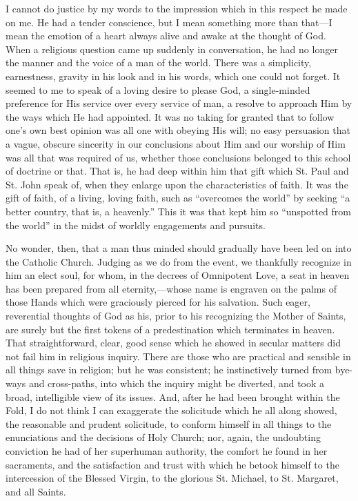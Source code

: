 I cannot do justice by my words to the impression
which in this respect he made on me. He had a tender
conscience, but I mean something more than that—I
mean the emotion of a heart always alive and awake at the
thought of God. When a religious question came up
suddenly in conversation, he had no longer the manner and
the voice of a man of the world. There was a simplicity,
earnestness, gravity in his look and in his words, which
one could not forget. It seemed to me to speak of a
loving desire to please God, a single-minded preference
for His service over every service of man, a resolve to
approach Him by the ways which He had appointed. It was
no taking for granted that to follow one's own best
opinion was all one with obeying His will; no easy
persuasion that a vague, obscure sincerity in our
conclusions about Him and our worship of Him was all that
was required of us, whether those conclusions belonged to
this school of doctrine or that. That is, he had deep
within him that gift which St. Paul and St. John speak
of, when they enlarge upon the characteristics of faith.
It was the gift of faith, of a living, loving faith, such
as ``overcomes the world'' by seeking ``a
better country, that is, a heavenly.'' This it was
that kept him so ``unspotted from the world'' in
the midst of worldly engagements and pursuits.

No wonder, then, that a man thus minded should
gradually have been led on into the Catholic Church.
Judging as we do from the event, we thankfully recognize
in him an elect soul, for whom, in the decrees of
Omnipotent Love, a seat in heaven has been prepared from
all eternity,—whose name is engraven on the palms of
those Hands which were graciously pierced for his
salvation. Such eager, reverential thoughts of God as
his, prior to his recognizing the Mother of Saints, are
surely but the first tokens of a predestination which
terminates in heaven. That straightforward, clear, good
sense which he showed in secular matters did not fail him
in religious inquiry. There are those who are practical
and sensible in all things save in religion; but he was
consistent; he instinctively turned from bye-ways and
cross-paths, into which the inquiry might be diverted,
and took a broad, intelligible view of its issues. And,
after he had been brought within the Fold, I do not think
I can exaggerate the solicitude which he all along
showed, the reasonable and prudent solicitude, to conform
himself in all things to the enunciations and the
decisions of Holy Church; nor, again, the undoubting
conviction he had of her superhuman authority, the
comfort he found in her sacraments, and the satisfaction
and trust with which he betook himself to the
intercession of the Blessed Virgin, to the glorious St.
Michael, to St. Margaret, and all Saints.

